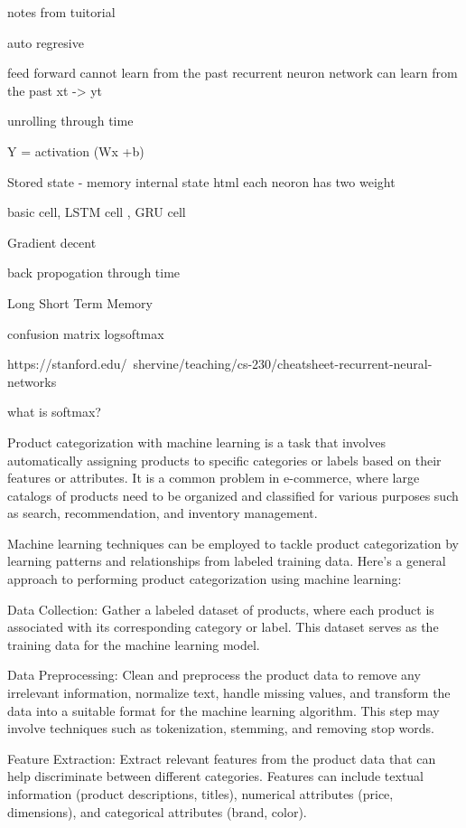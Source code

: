 notes from tuitorial

auto regresive

feed forward cannot learn from the past
recurrent neuron network can learn from the past
xt -> yt 

unrolling through time


Y = activation (Wx +b)


Stored state - memory
internal state html
each neoron has two weight 


basic cell, LSTM cell , GRU cell 

Gradient decent 

back propogation through time

Long Short Term Memory 





confusion matrix
logsoftmax

https://stanford.edu/~shervine/teaching/cs-230/cheatsheet-recurrent-neural-networks


what is softmax?


Product categorization with machine learning is a task that involves automatically assigning products to specific categories or labels based on their features or attributes. It is a common problem in e-commerce, where large catalogs of products need to be organized and classified for various purposes such as search, recommendation, and inventory management.

Machine learning techniques can be employed to tackle product categorization by learning patterns and relationships from labeled training data. Here's a general approach to performing product categorization using machine learning:

Data Collection: Gather a labeled dataset of products, where each product is associated with its corresponding category or label. This dataset serves as the training data for the machine learning model.

Data Preprocessing: Clean and preprocess the product data to remove any irrelevant information, normalize text, handle missing values, and transform the data into a suitable format for the machine learning algorithm. This step may involve techniques such as tokenization, stemming, and removing stop words.

Feature Extraction: Extract relevant features from the product data that can help discriminate between different categories. Features can include textual information (product descriptions, titles), numerical attributes (price, dimensions), and categorical attributes (brand, color).

